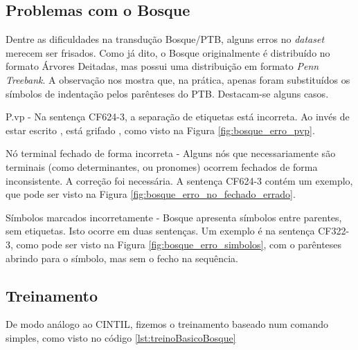 \subsection{Problemas com o Bosque}
\label{subsec:erros_bosque}
Dentre as dificuldades na transdução Bosque/PTB, alguns erros no \textit{dataset} merecem ser frisados. Como já dito, o Bosque originalmente é distribuído no formato Árvores Deitadas, mas possui uma distribuição em formato \textit{Penn Treebank}. A observação nos mostra que, na prática, apenas foram substituídos os símbolos de indentação pelos parênteses do PTB. 
Destacam-se alguns casos.

P.vp - Na sentença CF624-3, a separação de etiquetas está incorreta. Ao invés de estar escrito , está grifado , como visto na Figura \ref{fig:bosque_erro_pvp}.

\begin{center}
    
\end{center}

Nó terminal fechado de forma incorreta - Alguns nós que necessariamente são terminais (como determinantes, ou pronomes) ocorrem fechados de forma inconsistente. A correção foi necessária. A sentença CF624-3 contém um exemplo, que pode ser visto na Figura \ref{fig:bosque_erro_no_fechado_errado}.

\begin{center}
    
\end{center}

Símbolos marcados incorretamente - Bosque apresenta símbolos entre parentes, sem etiquetas. Isto ocorre em duas sentenças. Um exemplo é na sentença CF322-3, como pode ser visto na Figura \ref{fig:bosque_erro_simbolos}, com o parênteses abrindo para o símbolo, mas sem o fecho na sequência. 

\begin{center}
    
\end{center}

\subsection{Treinamento}
\label{subsec:treinamento_bosque}
De modo análogo ao CINTIL, fizemos o treinamento baseado num comando simples, como visto no código \ref{lst:treinoBasicoBosque}
\begin{center}
    
\end{center}

